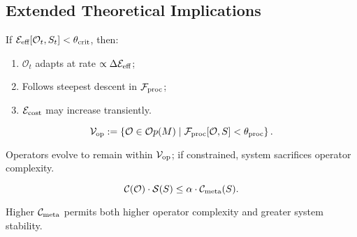 \subsection*{Extended Theoretical Implications}
\label{subsec:bk5_extended_theoretical_implications}
\begin{theorem} \label{theorem:bk5__srmf_operator_adaptation}

If $\mathcal{E}_{\text{eff}}[\mathcal{O}_t, S_t] < \theta_{\text{crit}}$, then:
\begin{enumerate}
    \item $\mathcal{O}_t$ adapts at rate $\propto \Delta\mathcal{E}_{\text{eff}}$;
    \item Follows steepest descent in $\mathcal{F}_{\text{proc}}$;
    \item $\mathcal{E}_{\text{cost}}$ may increase transiently.
\end{enumerate}
\end{theorem}
\begin{definition} \label{definition:bk5__operator_viability_set_v}

\[
\mathcal{V}_{\text{op}} := \left\{ \mathcal{O} \in \mathcal{O}p(M) \mid \mathcal{F}_{\text{proc}}[\mathcal{O}, S] < \theta_{\text{proc}} \right\}.
\]
\end{definition}
\begin{proposition}
\label{prop:bk5_operators_evolve}
Operators evolve to remain within $\mathcal{V}_{\text{op}}$; if constrained, system sacrifices operator complexity.
\end{proposition}
\begin{theorem} \label{theorem:bk5_complexity_stability_tradeoff}

\[
\mathcal{C}(\mathcal{O}) \cdot \mathcal{S}(S) \leq \alpha \cdot \mathcal{C}_{\text{meta}}(S).
\]
\end{theorem}
\begin{corollary}
\label{corollary:bk5_complexity_stability_tradeoff}
Higher $\mathcal{C}_{\text{meta}}$ permits both higher operator complexity and greater system stability.
\end{corollary}
